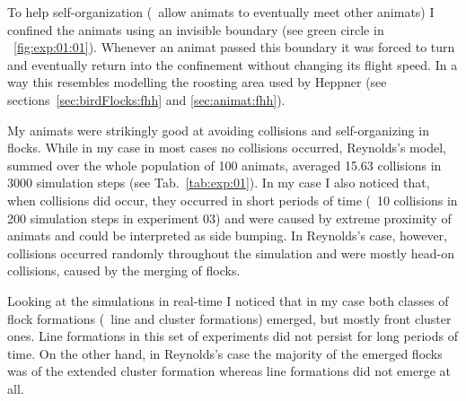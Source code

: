 %
To help self-organization (\ie\ allow animats to eventually meet other animats) I confined the animats using an invisible boundary (see green circle in \fig~\ref{fig:exp:01:01}). Whenever an animat passed this boundary it was forced to turn and eventually return into the confinement without changing its flight speed. In a way this resembles modelling the roosting area used by Heppner  \cite{heppner:1990} (see sections~\ref{sec:birdFlocks:fhh} and \ref{sec:animat:fhh}). 

My animats were strikingly good at avoiding collisions and self-organizing in flocks. While in my case in most cases no collisions occurred, Reynolds's model, summed over the whole population of 100 animats, averaged 15.63 collisions in 3000 simulation steps (see Tab.~\ref{tab:exp:01}). In my case I also noticed that, when collisions did occur, they occurred in short periods of time (\eg\ 10 collisions in 200 simulation steps in experiment 03) and were caused by extreme proximity of animats and could be interpreted as side bumping. In Reynolds's case, however, collisions occurred randomly throughout the simulation and were mostly head-on collisions, caused by the merging of flocks. 

Looking at the simulations in real-time I noticed that in my case both classes of flock formations (\ie\ line and cluster formations) emerged, but mostly front cluster ones. Line formations in this set of experiments did not persist for long periods of time. On the other hand, in Reynolds's case the majority of the emerged flocks was of the extended cluster formation whereas line formations did not emerge at all. 


